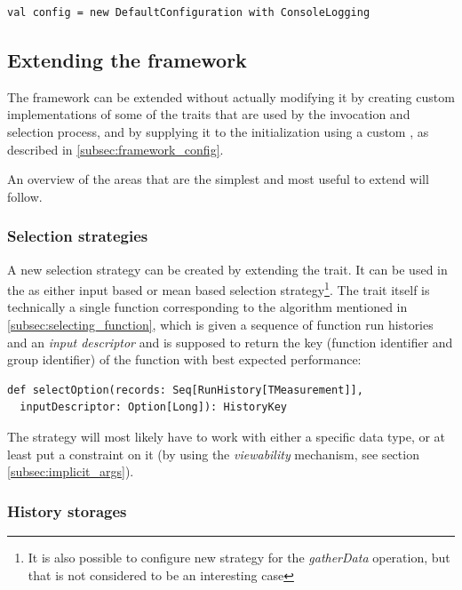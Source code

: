 \lstset{style=Scala}
\begin{lstlisting}
val config = new DefaultConfiguration with ConsoleLogging
\end{lstlisting}

\subsection{Extending the framework}

The framework can be extended without actually modifying it by creating custom implementations of some of the traits that are used by the invocation and selection process, and by supplying it to the  initialization using a custom , as described in \ref{subsec:framework_config}.

An overview of the areas that are the simplest and most useful to extend will follow.

\subsubsection{Selection strategies}

A new selection strategy can be created by extending the  trait. It can be used in the  as either input based or mean based selection strategy\footnote{It is also possible to configure new strategy for the \textit{gatherData} operation, but that is not considered to be an interesting case}. The trait itself is technically a single function corresponding to the algorithm mentioned in \ref{subsec:selecting_function}, which is given a sequence of function run histories and an \textit{input descriptor} and is supposed to return the key (function identifier and group identifier) of the function with best expected performance:

\lstset{style=Scala}
\begin{lstlisting}
def selectOption(records: Seq[RunHistory[TMeasurement]], 
  inputDescriptor: Option[Long]): HistoryKey
\end{lstlisting}

The strategy will most likely have to work with either a specific  data type, or at least put a constraint on it (by using the \textit{viewability} mechanism, see section \ref{subsec:implicit_args}).

\subsubsection{History storages}

